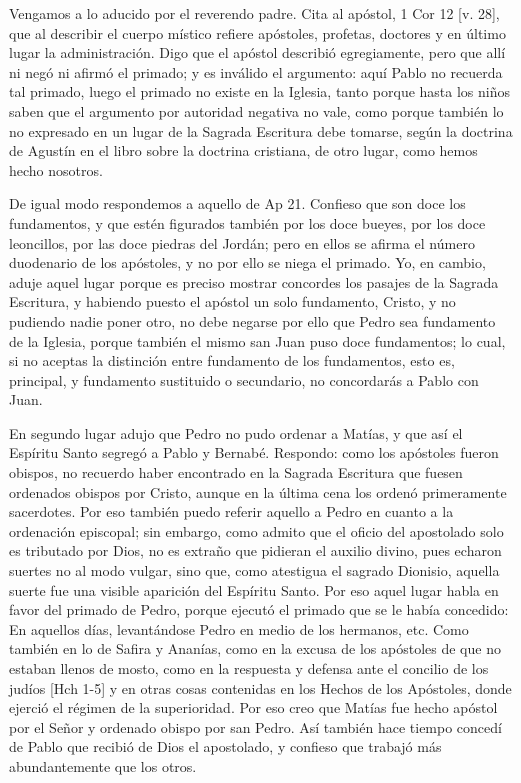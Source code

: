Vengamos a lo aducido por el reverendo padre. \marginpar{\small[317]} Cita al apóstol, 1 Cor 12 [v. 28], que al describir el cuerpo místico refiere apóstoles, profetas, doctores y en último lugar la administración. Digo que el apóstol describió egregiamente, pero que allí ni negó ni afirmó el primado; y es inválido el argumento: aquí Pablo no recuerda tal primado, luego el primado no existe en la Iglesia, tanto porque hasta los niños saben que el argumento por autoridad negativa no vale, como porque también lo no expresado en un lugar de la Sagrada Escritura debe tomarse, según la doctrina de Agustín en el libro sobre la doctrina cristiana, de otro lugar, como hemos hecho nosotros.

De igual modo respondemos a aquello de Ap 21. Confieso que son doce los fundamentos, y que estén figurados también por los doce bueyes, por los doce leoncillos, por las doce piedras del Jordán; pero en ellos se afirma el número duodenario de los apóstoles, y no por ello se niega el primado. Yo, en cambio, aduje aquel lugar porque es preciso mostrar concordes los pasajes de la Sagrada Escritura, y habiendo puesto el apóstol un solo fundamento, Cristo, y no pudiendo nadie poner otro, no debe negarse por ello que Pedro sea fundamento de la Iglesia, porque también el mismo san Juan puso doce fundamentos; lo cual, si no aceptas la distinción entre fundamento de los fundamentos, esto es, principal, y fundamento sustituido o secundario, no concordarás a Pablo con Juan.

En segundo lugar adujo que Pedro no pudo ordenar a Matías, y que así el Espíritu Santo segregó a Pablo y Bernabé. Respondo: como los apóstoles fueron obispos, no recuerdo haber encontrado en la Sagrada Escritura que fuesen ordenados obispos por Cristo, aunque en la última cena los ordenó primeramente sacerdotes. Por eso también puedo referir aquello a Pedro en cuanto a la ordenación episcopal; sin embargo, como admito que el oficio del apostolado solo es tributado por Dios, no es extraño que pidieran el auxilio divino, pues echaron suertes no al modo vulgar, sino que, como atestigua el sagrado Dionisio, aquella suerte fue una visible aparición del Espíritu Santo. Por eso aquel lugar habla en favor del primado de Pedro, porque ejecutó el primado que se le había concedido: En aquellos días, levantándose Pedro en medio de los hermanos, etc. Como también en lo de Safira y Ananías, como en la excusa de los apóstoles de que no estaban llenos de mosto, como en la respuesta y defensa ante el concilio de los judíos [Hch 1-5] y en otras cosas contenidas en los Hechos de los Apóstoles, donde ejerció el régimen de la superioridad. Por eso creo que Matías fue hecho apóstol por el Señor y ordenado obispo por san Pedro. Así también hace tiempo concedí de Pablo que recibió de Dios el apostolado, y confieso que trabajó más abundantemente que los otros.

